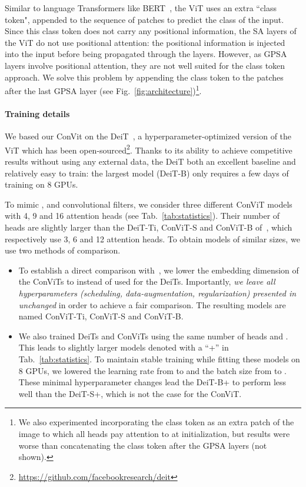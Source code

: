 \documentclass[a4paper,11pt,twocolumn]{article}
\newcommand{\citet}[1]{\textcite{#1}}
\begin{document}
Similar to language Transformers like BERT~\cite{devlin2018bert}, the ViT uses an extra ``class token", appended to the sequence of patches to predict the class of the input. Since this class token does not carry any positional information, the SA layers of the ViT do not use positional attention: the positional information is injected into the input before being propagated through the layers. However, as GPSA layers involve positional attention, they are not well suited for the class token approach. We solve this problem by appending the class token to the patches after the last GPSA layer (see Fig.~\ref{fig:architecture})\footnote{We also experimented incorporating the class token as an extra patch of the image to which all heads pay attention to at initialization, but results were worse than concatenating the class token after the GPSA layers (not shown).}.

\paragraph{Training details}

We based our ConVit on the DeiT~\cite{touvron2020training}, a hyperparameter-optimized version of the ViT which has been open-sourced\footnote{ \url{https://github.com/facebookresearch/deit}}. Thanks to its ability to achieve competitive results without using any external data, the DeiT both an excellent baseline and relatively easy to train: the largest model (DeiT-B) only requires a few days of training on 8 GPUs. 

To mimic ,  and  convolutional filters, we consider three different ConViT models with 4, 9 and 16 attention heads (see Tab.~\ref{tab:statistics}). Their number of heads are slightly larger than the DeiT-Ti, ConViT-S and ConViT-B of~\citet{touvron2020training}, which respectively use 3, 6 and 12 attention heads. To obtain models of similar sizes, we use two methods of comparison.
\begin{itemize}
    \item To establish a direct comparison with~\citet{touvron2020training}, we lower the embedding dimension of the ConViTs to  instead of  used for the DeiTs. Importantly, \textit{we leave all hyperparameters (scheduling, data-augmentation, regularization) presented in~\cite{touvron2020training} unchanged} in order to achieve a fair comparison. The resulting models are named ConViT-Ti, ConViT-S and ConViT-B.
    \item We also trained DeiTs and ConViTs using the same number of heads and . This leads to slightly larger models denoted with a ``+'' in Tab.~\ref{tab:statistics}. To maintain stable training while fitting these models on 8 GPUs, we lowered the learning rate from  to  and the batch size from  to . These minimal hyperparameter changes lead the DeiT-B+ to perform less well than the DeiT-S+, which is not the case for the ConViT.
\end{itemize}
\end{document}
